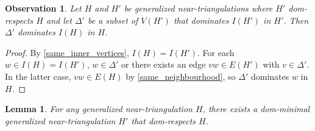 \documentclass[11pt]{article}
\newtheorem{obs}{Observation}
\newtheorem{lem}{Lemma}
\theoremstyle{definition}
\begin{document}
\begin{obs}
  Let $H$ and $H'$ be generalized near-triangulations where $H'$ dom-respects $H$ and let $\Delta'$ be a subset of $V(H')$ that dominates $I(H')$ in $H'$.  Then $\Delta'$ dominates $I(H)$ in $H$.
\end{obs}

\begin{proof}
  By \cref{same_inner_vertices}, $I(H)=I(H')$. For each $w\in I(H)=I(H')$, $w\in \Delta'$ or there exists an edge $vw\in E(H')$ with $v\in\Delta'$.  In the latter case, $vw\in E(H)$ by \cref{same_neighbourhood}, so $\Delta'$ dominates $w$ in $H$.
\end{proof}

\begin{lem}\label{dom_minimal}
  For any generalized near-triangulation $H$, there exists a dom-minimal generalized near-triangulation $H'$ that dom-respects $H$.
\end{lem}
\end{document}
